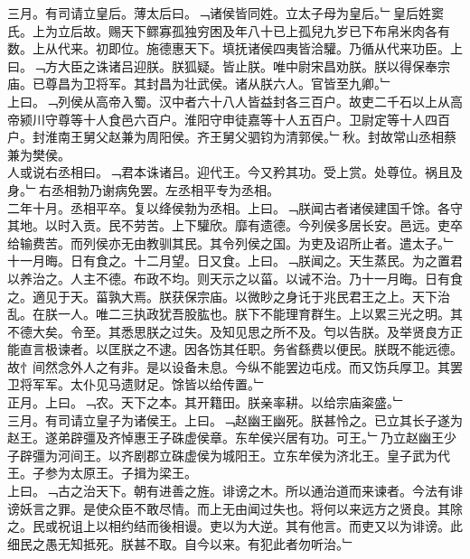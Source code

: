 \documentclass{zhvt-classic}
\begin{document}
\hspace*{2em}三月。有司请立皇后。薄太后曰。﹁诸侯皆同姓。立太子母为皇后。﹂皇后姓窦氏。上为立后故。赐天下鳏寡孤独穷困及年八十已上孤兒九岁已下布帛米肉各有数。上从代来。初即位。施德惠天下。填抚诸侯四夷皆洽驩。乃循从代来功臣。上曰。﹁方大臣之诛诸吕迎朕。朕狐疑。皆止朕。唯中尉宋昌劝朕。朕以得保奉宗庙。已尊昌为卫将军。其封昌为壮武侯。诸从朕六人。官皆至九卿。﹂\\
\hspace*{2em}上曰。﹁列侯从高帝入蜀。汉中者六十八人皆益封各三百户。故吏二千石以上从高帝颍川守尊等十人食邑六百户。淮阳守申徒嘉等十人五百户。卫尉定等十人四百户。封淮南王舅父赵兼为周阳侯。齐王舅父驷钧为清郭侯。﹂秋。封故常山丞相蔡兼为樊侯。\\
\hspace*{2em}人或说右丞相曰。﹁君本诛诸吕。迎代王。今又矜其功。受上赏。处尊位。祸且及身。﹂右丞相勃乃谢病免罢。左丞相平专为丞相。\\
\hspace*{2em}二年十月。丞相平卒。复以绛侯勃为丞相。上曰。﹁朕闻古者诸侯建国千馀。各守其地。以时入贡。民不劳苦。上下驩欣。靡有遗德。今列侯多居长安。邑远。吏卒给输费苦。而列侯亦无由教驯其民。其令列侯之国。为吏及诏所止者。遣太子。﹂\\
\hspace*{2em}十一月晦。日有食之。十二月望。日又食。上曰。﹁朕闻之。天生蒸民。为之置君以养治之。人主不德。布政不均。则天示之以菑。以诫不治。乃十一月晦。日有食之。適见于天。菑孰大焉。朕获保宗庙。以微眇之身讬于兆民君王之上。天下治乱。在朕一人。唯二三执政犹吾股肱也。朕下不能理育群生。上以累三光之明。其不德大矣。令至。其悉思朕之过失。及知见思之所不及。匄以告朕。及举贤良方正能直言极谏者。以匡朕之不逮。因各饬其任职。务省繇费以便民。朕既不能远德。故忄间然念外人之有非。是以设备未息。今纵不能罢边屯戍。而又饬兵厚卫。其罢卫将军军。太仆见马遗财足。馀皆以给传置。﹂\\
\hspace*{2em}正月。上曰。﹁农。天下之本。其开籍田。朕亲率耕。以给宗庙粢盛。﹂\\
\hspace*{2em}三月。有司请立皇子为诸侯王。上曰。﹁赵幽王幽死。朕甚怜之。已立其长子遂为赵王。遂弟辟彊及齐悼惠王子硃虚侯章。东牟侯兴居有功。可王。﹂乃立赵幽王少子辟彊为河间王。以齐剧郡立硃虚侯为城阳王。立东牟侯为济北王。皇子武为代王。子参为太原王。子揖为梁王。\\
\hspace*{2em}上曰。﹁古之治天下。朝有进善之旌。诽谤之木。所以通治道而来谏者。今法有诽谤妖言之罪。是使众臣不敢尽情。而上无由闻过失也。将何以来远方之贤良。其除之。民或祝诅上以相约结而後相谩。吏以为大逆。其有他言。而吏又以为诽谤。此细民之愚无知抵死。朕甚不取。自今以来。有犯此者勿听治。﹂\\
\end{document}
